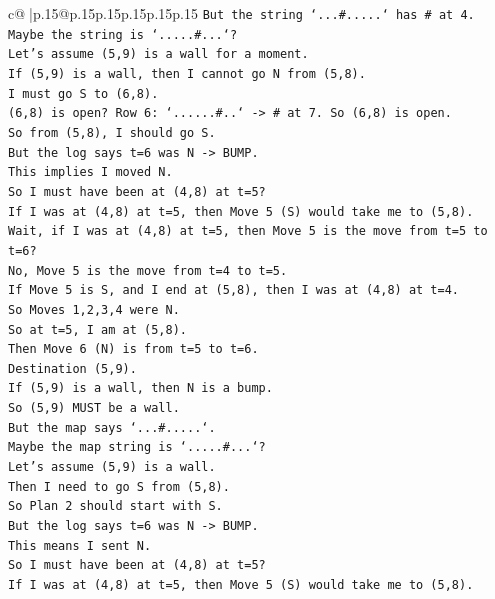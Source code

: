 \documentclass{article}
\begin{document}
{\begin{supertabular}{c@{$\;$}|p{.15\linewidth}@{}p{.15\linewidth}p{.15\linewidth}p{.15\linewidth}p{.15\linewidth}p{.15\linewidth}}
{{{\texttt{But the string `...\#.....` has \# at 4.} \\
\texttt{Maybe the string is `.....\#...`?} \\
\texttt{Let's assume (5,9) is a wall for a moment.} \\
\texttt{If (5,9) is a wall, then I cannot go N from (5,8).} \\
\texttt{I must go S to (6,8).} \\
\texttt{(6,8) is open? Row 6: `......\#..` {-}> \# at 7. So (6,8) is open.} \\
\texttt{So from (5,8), I should go S.} \\
\texttt{But the log says t=6 was N {-}> BUMP.} \\
\texttt{This implies I moved N.} \\
\texttt{So I must have been at (4,8) at t=5?} \\
\texttt{If I was at (4,8) at t=5, then Move 5 (S) would take me to (5,8).} \\
\texttt{Wait, if I was at (4,8) at t=5, then Move 5 is the move from t=5 to t=6?} \\
\texttt{No, Move 5 is the move from t=4 to t=5.} \\
\texttt{If Move 5 is S, and I end at (5,8), then I was at (4,8) at t=4.} \\
\texttt{So Moves 1,2,3,4 were N.} \\
\texttt{So at t=5, I am at (5,8).} \\
\texttt{Then Move 6 (N) is from t=5 to t=6.} \\
\texttt{Destination (5,9).} \\
\texttt{If (5,9) is a wall, then N is a bump.} \\
\texttt{So (5,9) MUST be a wall.} \\
\texttt{But the map says `...\#.....`.} \\
\texttt{Maybe the map string is `.....\#...`?} \\
\texttt{Let's assume (5,9) is a wall.} \\
\texttt{Then I need to go S from (5,8).} \\
\texttt{So Plan 2 should start with S.} \\
\texttt{But the log says t=6 was N {-}> BUMP.} \\
\texttt{This means I sent N.} \\
\texttt{So I must have been at (4,8) at t=5?} \\
\texttt{If I was at (4,8) at t=5, then Move 5 (S) would take me to (5,8).} \\
}}}
\end{supertabular}}
\end{document}
